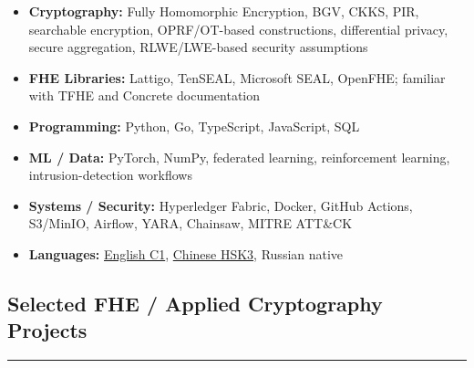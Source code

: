 \documentclass[10.5pt,letterpaper]{article}
\newcommand{\sectionline}[1]{
\vspace{0.18cm}
\subsection*{\large #1}
\vspace{-0.55em}
\hrule
\vspace{0.25em}
}
\begin{document}
\begin{itemize}[leftmargin=0em, noitemsep]
    \renewcommand\labelitemi{}
    \item \textbf{Cryptography:} Fully Homomorphic Encryption, BGV, CKKS, PIR, searchable encryption, OPRF/OT-based constructions, differential privacy, secure aggregation, RLWE/LWE-based security assumptions
    \item \textbf{FHE Libraries:} Lattigo, TenSEAL, Microsoft SEAL, OpenFHE; familiar with TFHE and Concrete documentation
    \item \textbf{Programming:} Python, Go, TypeScript, JavaScript, SQL
    \item \textbf{ML / Data:} PyTorch, NumPy, federated learning, reinforcement learning, intrusion-detection workflows
    \item \textbf{Systems / Security:} Hyperledger Fabric, Docker, GitHub Actions, S3/MinIO, Airflow, YARA, Chainsaw, MITRE ATT\&CK
    \item \textbf{Languages:}
    \href{https://certs.duolingo.com/751e0ef152565727b6d5fd909699ceaa}{English C1},
    \href{https://admin.chinesetest.cn/queryScore.do?sid=c2tActR9Wb%2704b861aefbdc5e9fd0b44afa717d08cbceb0720e582ce25f%2724d7sWsQ5nVUQSwD}{Chinese HSK3},
    Russian native
\end{itemize}

\sectionline{Selected FHE / Applied Cryptography Projects}
\end{document}
